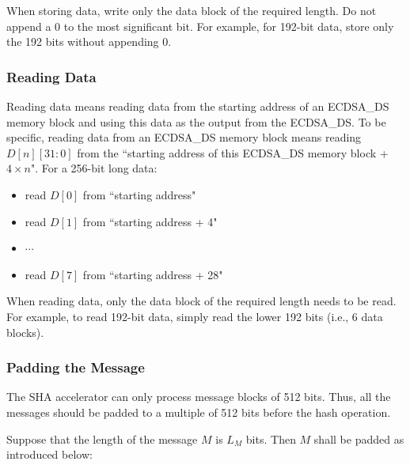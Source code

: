 \documentclass[main\_\_EN.tex]{subfiles}
\begin{document}
\begin{tiplisting}
When storing data, write only the data block of the required length. Do not append a 0 to the most significant bit. For example, for 192-bit data, store only the 192 bits without appending 0.
\end{tiplisting}

\subsubsection{Reading Data}

Reading data means reading data from the starting address of an ECDSA\_DS memory block and using this data as the output from the ECDSA\_DS. To be specific, reading data from an ECDSA\_DS memory block means reading $D[n][31:0]$ from the ``starting address of this ECDSA\_DS memory block + $4 \times n$".
For a 256-bit long data:
\begin{itemize}
    \item read $D[0]$ from ``starting address"
    \item read $D[1]$ from ``starting address + 4"
    \item $\cdots$
    \item read $D[7]$ from ``starting address + 28"
\end{itemize}

\begin{tiplisting}
When reading data, only the data block of the required length needs to be read. For example, to read 192-bit data, simply read the lower 192 bits (i.e., 6 data blocks).
\end{tiplisting}

\subsubsection{Padding the Message}\label{sec:ecdsa-msg-padding}

The SHA accelerator can only process message blocks of 512 bits. Thus, all the messages should be padded to a multiple of 512 bits before the hash operation.

Suppose that the length of the message \begin{math}M\end{math} is \begin{math} L_M \end{math} bits. Then \begin{math} M \end{math} shall be padded as introduced below:
\end{document}
